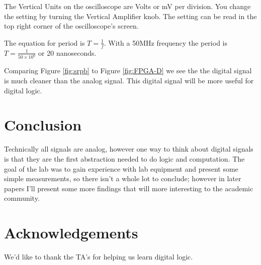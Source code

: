 \documentclass[journal,onecolumn]{IEEEtran}
\begin{document}
The Vertical Units on the oscilloscope are Volts or mV per division. You change the setting by turning the Vertical Amplifier knob. The setting can be read in the top right corner of the oscilloscope's screen.

The equation for period is $T = \frac{1}{f}$. With a 50MHz frequency the period is $T = \frac{1}{50\times 10^6}$ or 20 nanoseconds.

Comparing Figure \ref{fig:srpb} to Figure \ref{fig:FPGA-D} we see the the digital signal is much cleaner than the analog signal. This digital signal will be more useful for digital logic.
\section*{Conclusion}
Technically all signals are analog, however one way to think about digital signals is that they are the first abstraction needed to do logic and computation. The goal of the lab was to gain experience with lab equipment and present some simple measurements, so there isn't a whole lot to conclude; however in later papers I'll present some more findings that will more interesting to the academic community.
\section*{Acknowledgements}
We'd like to thank the TA's for helping us learn digital logic.


\end{document}
